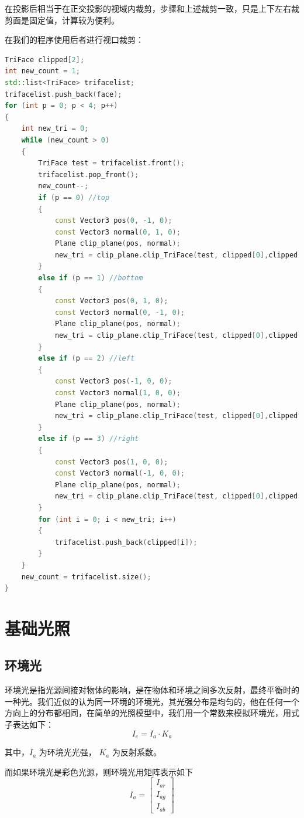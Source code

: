 \documentclass[12pt,oneside,a4paper]{ctexart}
\begin{document}
在投影后相当于在正交投影的视域内裁剪，步骤和上述裁剪一致，只是上下左右裁剪面是固定值，计算较为便利。

在我们的程序使用后者进行视口裁剪：
\newline
\begin{lstlisting}[language=c++]
TriFace clipped[2];
int new_count = 1;
std::list<TriFace> trifacelist;
trifacelist.push_back(face);
for (int p = 0; p < 4; p++)
{
	int new_tri = 0;
	while (new_count > 0)
	{
		TriFace test = trifacelist.front();
		trifacelist.pop_front();
		new_count--;
		if (p == 0) //top
		{
			const Vector3 pos(0, -1, 0);
			const Vector3 normal(0, 1, 0);
			Plane clip_plane(pos, normal);
			new_tri = clip_plane.clip_TriFace(test, clipped[0],clipped[1]);
		}
		else if (p == 1) //bottom
		{
			const Vector3 pos(0, 1, 0);
			const Vector3 normal(0, -1, 0);
			Plane clip_plane(pos, normal);
			new_tri = clip_plane.clip_TriFace(test, clipped[0],clipped[1]);
		}
		else if (p == 2) //left
		{
			const Vector3 pos(-1, 0, 0);
			const Vector3 normal(1, 0, 0);
			Plane clip_plane(pos, normal);
			new_tri = clip_plane.clip_TriFace(test, clipped[0],clipped[1]);
		}
		else if (p == 3) //right
		{
			const Vector3 pos(1, 0, 0);
			const Vector3 normal(-1, 0, 0);
			Plane clip_plane(pos, normal);
			new_tri = clip_plane.clip_TriFace(test, clipped[0],clipped[1]);
		}
		for (int i = 0; i < new_tri; i++)
		{
			trifacelist.push_back(clipped[i]);
		}
	}
	new_count = trifacelist.size();
}
\end{lstlisting}
\section{基础光照}
\subsection{环境光}
环境光是指光源间接对物体的影响，是在物体和环境之间多次反射，最终平衡时的一种光。我们近似的认为同一环境的环境光，其光强分布是均匀的，他在任何一个方向上的分布都相同，在简单的光照模型中，我们用一个常数来模拟环境光，用式子表达如下：
\begin{equation*}
	I_{e}=I_{a} \cdot K_{a}
\end{equation*}

其中，$I_{a}$ 为环境光光强， $K_{a}$ 为反射系数。

而如果环境光是彩色光源，则环境光用矩阵表示如下
\begin{equation*}
	I_{a}=
	\begin{bmatrix}
		I_{ar} \\
		I_{ag} \\
		I_{ab}
	\end{bmatrix}
\end{equation*}
\end{document}
